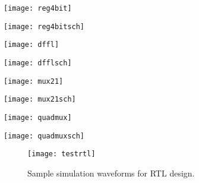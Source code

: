 
	\begin{center}
	\texttt{[image: reg4bit]}
	\end{center}
\vspace{10mm}
	\begin{center}
	\texttt{[image: reg4bitsch]}
	\end{center}
\pagebreak
{}
	\begin{center}
	\texttt{[image: dffl]}
	\end{center}

	\begin{center}
	\texttt{[image: dfflsch]}
	\end{center}
	\begin{center}
	\texttt{[image: mux21]}
	\end{center}
	\begin{center}
	\texttt{[image: mux21sch]}
	\end{center}
	\begin{center}
	\texttt{[image: quadmux]}
	\end{center}
	\begin{center}
	\texttt{[image: quadmuxsch]}
	\end{center}

\begin{figure}[ht]
  \centering
  \texttt{[image: testrtl]}
  \caption{Sample simulation waveforms for RTL design.}
  \label{fig:testrtl}
\end{figure} 
\FloatBarrier


